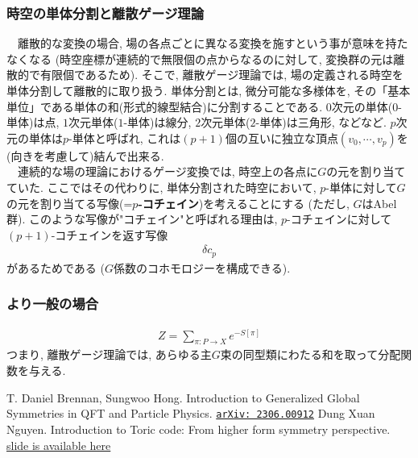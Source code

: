 \documentclass{ltjsarticle}
\theoremstyle{mystyle} %
\numberwithin{equation}{section}
\begin{document}
\subsubsection{時空の単体分割と離散ゲージ理論}
　離散的な変換の場合, 場の各点ごとに異なる変換を施すという事が意味を持たなくなる
(時空座標が連続的で無限個の点からなるのに対して, 変換群の元は離散的で有限個であるため). 
そこで, 離散ゲージ理論では, 場の定義される時空を単体分割して離散的に取り扱う. 
単体分割とは, 微分可能な多様体を, その「基本単位」である単体の和(形式的線型結合)に分割することである. 
$0$次元の単体($0$-単体)は点, $1$次元単体($1$-単体)は線分, $2$次元単体($2$-単体)は三角形, などなど. 
$p$次元の単体は$p$-単体と呼ばれ, これは$(p+1)$個の互いに独立な頂点$(v_0, \cdots, v_p)$を(向きを考慮して)結んで出来る. \\
　連続的な場の理論におけるゲージ変換では, 時空上の各点に$G$の元を割り当てていた. 
ここではその代わりに, 単体分割された時空において, $p$-単体に対して$G$の元を割り当てる写像(=\textbf{$p$-コチェイン})を考えることにする
(ただし, $G$はAbel群). 
このような写像が"コチェイン"と呼ばれる理由は, $p$-コチェインに対して$(p+1)$-コチェインを返す写像
\begin{align}
    \delta c_p
\end{align}
があるためである
($G$係数のコホモロジーを構成できる). 
\subsubsection{より一般の場合}
\begin{align}
    Z=\sum_{\pi: P\to X}e^{-S[\pi]}
\label{PFdiscrete}
\end{align}
つまり, 離散ゲージ理論では, あらゆる主$G$束の同型類にわたる和を取って分配関数を与える. 
\begin{thebibliography}{99}
     T. Daniel Brennan, Sungwoo Hong. 
    Introduction to Generalized Global Symmetries in QFT and Particle Physics. \href{https://arxiv.org/abs/2306.00912}{\texttt{arXiv: 2306.00912}}
     Dung Xuan Nguyen.  
    Introduction to Toric code: From higher form symmetry perspective. \href{https://pcs.ibs.re.kr/PCS_Workshops/PCS_Asian_Network_School_&_Workshop_Talks_2023_files/Dung_Xuan_Nguyen.pdf}{slide is available here}
\end{thebibliography}
\end{document}
